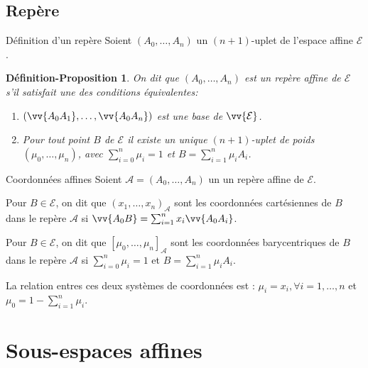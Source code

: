 \documentclass[aspectratio=1610 %
]{beamer}
\newtheorem{defprop}[theorem]{Définition-Proposition}
\let\ens\mathcal
\begin{document}
\subsection{Repère}
  \begin{frame}{Définition d'un repère}
    Soient $(A_{0},\ldots,A_{n})$ un $(n+1)$-uplet de l'espace affine $\ens{E}$.\pause\\
    \begin{defprop}
      On dit que $(A_{0},\ldots,A_{n})$ est \alert{un repère affine} de $\ens{E}$ s'il satisfait une des conditions équivalentes:
      \begin{enumerate}[<+(1)->]
        \item $(\vv{A_{0}A_{1}},\ldots,\vv{A_{0}A_{n}})$ est une base de $\vv{\ens{E}}$.
        \item Pour tout point $B$ de $\ens{E}$ il existe un unique $(n+1)$-uplet de poids $(\mu_{0},\ldots,\mu_{n})$, avec $\sum_{i=0}^{n}\mu_{i}=1$ et $B=\sum_{i=1}^{n}\mu_{i}A_{i}$.
      \end{enumerate}
    \end{defprop}
  \end{frame}
  \begin{frame}{Coordonnées affines}
    Soient $\mathcal{A}=(A_{0},\ldots,A_{n})$ un un repère affine de $\ens{E}$.\pause\\
    \begin{definition}
      Pour $B \in \ens{E}$, on dit que $(x_{1},\ldots,x_{n})_{\mathcal{A}}$ sont les \alert{coordonnées cartésiennes} de $B$ dans le repère $\mathcal{A}$ si $\vv{A_{0}B} = \sum_{i=1}^{n} x_{i}\vv{A_{0}A_{i}}$.
    \end{definition}\pause
    \begin{definition}
      Pour $B \in \ens{E}$, on dit que $[\mu_{0},\ldots,\mu_{n}]_{\mathcal{A}}$ sont les \alert{coordonnées barycentriques} de $B$ dans le repère $\mathcal{A}$ si $\sum_{i=0}^{n}\mu_{i}=1$ et $B=\sum_{i=1}^{n}\mu_{i}A_{i}$.
    \end{definition}\pause
    La relation entres ces deux systèmes de coordonnées est : $\mu_{i}=x_{i}, \forall i=1,\ldots,n$ et $\mu_{0}=1-\sum_{i=1}^{n}\mu_{i}$.
  \end{frame}

\section{Sous-espaces affines}
\end{document}
